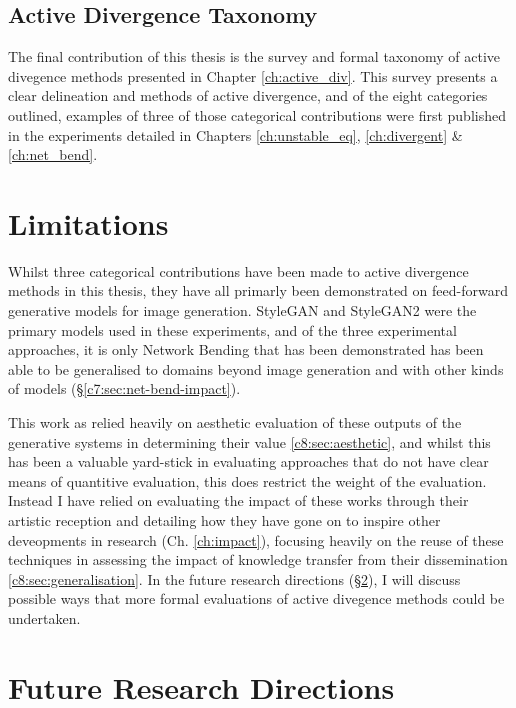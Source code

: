 \subsection{Active Divergence Taxonomy}

The final contribution of this thesis is the survey and formal taxonomy of active divegence methods presented in Chapter \ref{ch:active_div}.
This survey presents a clear delineation and methods of active divergence, and of the eight categories outlined, examples of three of those categorical contributions were first published in the experiments detailed in Chapters \ref{ch:unstable_eq}, \ref{ch:divergent}  \& \ref{ch:net_bend}.

\section{Limitations}

Whilst three categorical contributions have been made to active divergence methods in this thesis, they have all primarly been demonstrated on feed-forward generative models for image generation.
StyleGAN \citep{karras2019style} and StyleGAN2 \citep{karras2019analyzing} were the primary models used in these experiments, and of the three experimental approaches, it is only Network Bending that has been demonstrated has been able to be generalised to domains beyond image generation and with other kinds of models (\S \ref{c7:sec:net-bend-impact}).

This work as relied heavily on aesthetic evaluation of these outputs of the generative systems in determining their value \ref{c8:sec:aesthetic}, and whilst this has been a valuable yard-stick in evaluating approaches that do not have clear means of quantitive evaluation, this does restrict the weight of the evaluation.
Instead I have relied on evaluating the impact of these works through their artistic reception and detailing how they have gone on to inspire other deveopments in research (Ch. \ref{ch:impact}), focusing heavily on the reuse of these techniques in assessing the impact of knowledge transfer from their dissemination \ref{c8:sec:generalisation}.
In the future research directions (\S \ref{c9:sec:future}), I will discuss possible ways that more formal evaluations of active divegence methods could be undertaken.

\section{Future Research Directions}
\label{c9:sec:future}

